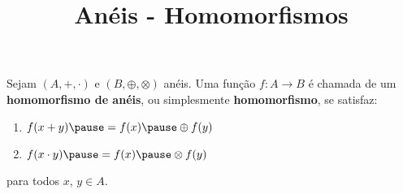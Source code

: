 \documentclass{beamer}
\title{An\'eis - Homomorfismos}
\author[\autor]{\autor}
\institute[\instituto]{\instituto}
\date{}
\begin{document}
    \begin{frame}
        \maketitle
    \end{frame}


    \begin{frame}
        \begin{definicao}
            Sejam $(A, +, \cdot)$ \pause e $(B, \oplus, \otimes)$ \pause an\'eis. \pause Uma fun{\c c}{\~a}o $f : A \to B$ \pause \'e chamada de um \textbf{homomorfismo de an\'eis}, \pause ou simplesmente \textbf{homomorfismo}, \pause se satisfaz:\pause
            \begin{enumerate}[label={\roman*})]
                \item $f(x + y) \pause = f(x) \pause \oplus f(y)$\pause

                \vspace{.5cm}

                \item $f(x \cdot y) \pause = f(x) \pause \otimes f(y)$\pause

                \vspace{.5cm}
            \end{enumerate}
            para todos $x$, $y \in A$.\pause
        \end{definicao}
    \end{frame}
\end{document}
